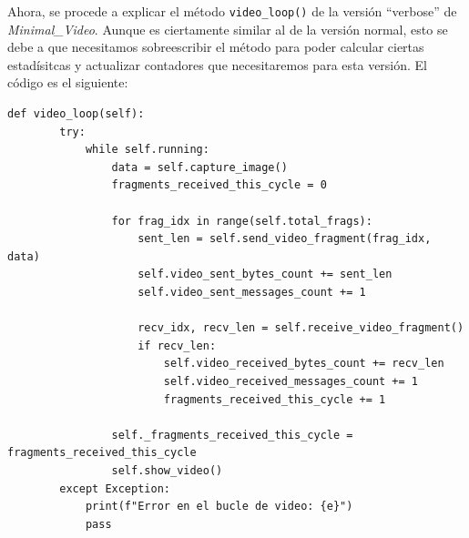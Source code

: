 Ahora, se procede a explicar el método \texttt{video\_loop()} de la versión ``verbose'' de \textit{Minimal\_Video}. Aunque es ciertamente similar al de la versión normal, esto se debe a que necesitamos sobreescribir el método para poder calcular ciertas estadísitcas y actualizar contadores que necesitaremos para esta versión. El código es el siguiente:

\begin{lstlisting}[style=pythonstyle, caption={Método \texttt{video\_loop()} de \textit{Minimal\_Video\_verbose}.}, label={lst:video_loop_minimal_video_verbose}]
    def video_loop(self):
        try:
            while self.running:
                data = self.capture_image()
                fragments_received_this_cycle = 0

                for frag_idx in range(self.total_frags):
                    sent_len = self.send_video_fragment(frag_idx, data)
                    self.video_sent_bytes_count += sent_len
                    self.video_sent_messages_count += 1

                    recv_idx, recv_len = self.receive_video_fragment()
                    if recv_len:
                        self.video_received_bytes_count += recv_len
                        self.video_received_messages_count += 1
                        fragments_received_this_cycle += 1

                self._fragments_received_this_cycle = fragments_received_this_cycle
                self.show_video()
        except Exception:
            print(f"Error en el bucle de video: {e}")
            pass
\end{lstlisting}
\vspace{\baselineskip}

